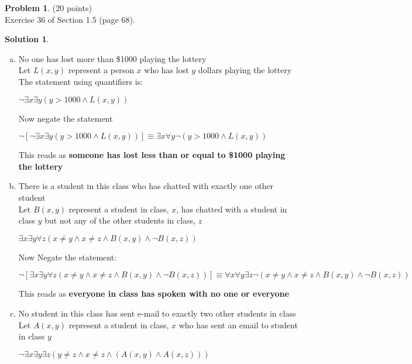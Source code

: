 \documentclass{article}
\theoremstyle{definition}
\newtheorem{problem}{Problem}
\newtheorem*{solution}{Solution}
\begin{document}
\newpage

\begin{problem} (20 points)\\
Exercise 36 of Section 1.5 (page 68).
\end{problem}

\begin{solution}\ \\
\begin{enumerate}[a)]
\item No one has lost more than \$1000 playing the lottery \\
      Let $L(x,y)$ represent a person $x$ who has lost $y$ dollars playing the lottery \\
      The statement using quantifiers is:

      $\neg \exists x \exists y ( y > 1000 \wedge L(x,y) )$

      Now negate the statement

      $\neg[\neg \exists x \exists y ( y > 1000 \wedge L(x,y) )] \equiv \exists x \forall y
          \neg (y > 1000 \wedge L(x,y) )$

      This reads as \textbf{someone has lost less than or equal to \$1000 playing the lottery}

\item There is a student in this class who has chatted with exactly one other student \\
      Let $B(x,y)$ represent a student in class, $x$, has chatted with a student in class $y$ but not any of the
      other students in class, $z$

      $\exists x \exists y \forall z ( x \neq y \wedge x \neq z \wedge B(x,y) \wedge \neg B(x,z) )$

      Now Negate the statement:

      $\neg [\exists x \exists y \forall z ( x \neq y \wedge x \neq z \wedge B(x,y) \wedge \neg B(x,z) )] \equiv
          \forall x \forall y \exists z \neg ( x \neq y \wedge x \neq z \wedge B(x,y) \wedge \neg B(x,z) )$

      This reads as \textbf{everyone in class has spoken with no one or everyone}

\item No student in this class has sent e-mail to exactly two other students in class \\
      Let $A(x,y)$ represent a student in class, $x$ who has sent an email to student in class $y$

      $\neg \exists x \exists y \exists z ( y \neq z \wedge x \neq z \wedge ( A(x,y) \wedge A(x,z)  )  )$


\end{enumerate}
\end{solution}
\end{document}
